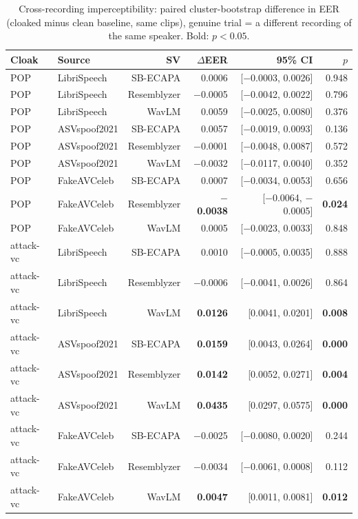 \documentclass[11pt]{article}
\begin{document}
\begin{table}[H]
\centering
\small
\caption{Cross-recording imperceptibility: paired cluster-bootstrap
difference in EER (cloaked minus clean baseline, same clips), genuine
trial = a different recording of the same speaker. Bold: $p<0.05$.}
\label{tab:crossrecording}
\begin{tabular}{llrrrr}
\toprule
Cloak & Source & SV & $\Delta$EER & 95\% CI & $p$ \\
\midrule
POP & LibriSpeech & SB-ECAPA & 0.0006 & [$-$0.0003, 0.0026] & 0.948 \\
POP & LibriSpeech & Resemblyzer & $-$0.0005 & [$-$0.0042, 0.0022] & 0.796 \\
POP & LibriSpeech & WavLM & 0.0059 & [$-$0.0025, 0.0080] & 0.376 \\
POP & ASVspoof2021 & SB-ECAPA & 0.0057 & [$-$0.0019, 0.0093] & 0.136 \\
POP & ASVspoof2021 & Resemblyzer & $-$0.0001 & [$-$0.0048, 0.0087] & 0.572 \\
POP & ASVspoof2021 & WavLM & $-$0.0032 & [$-$0.0117, 0.0040] & 0.352 \\
POP & FakeAVCeleb & SB-ECAPA & 0.0007 & [$-$0.0034, 0.0053] & 0.656 \\
POP & FakeAVCeleb & Resemblyzer & \textbf{$-$0.0038} & [$-$0.0064, $-$0.0005] & \textbf{0.024} \\
POP & FakeAVCeleb & WavLM & 0.0005 & [$-$0.0023, 0.0033] & 0.848 \\
\addlinespace
attack-vc & LibriSpeech & SB-ECAPA & 0.0010 & [$-$0.0005, 0.0035] & 0.888 \\
attack-vc & LibriSpeech & Resemblyzer & $-$0.0006 & [$-$0.0041, 0.0026] & 0.864 \\
attack-vc & LibriSpeech & WavLM & \textbf{0.0126} & [0.0041, 0.0201] & \textbf{0.008} \\
attack-vc & ASVspoof2021 & SB-ECAPA & \textbf{0.0159} & [0.0043, 0.0264] & \textbf{0.000} \\
attack-vc & ASVspoof2021 & Resemblyzer & \textbf{0.0142} & [0.0052, 0.0271] & \textbf{0.004} \\
attack-vc & ASVspoof2021 & WavLM & \textbf{0.0435} & [0.0297, 0.0575] & \textbf{0.000} \\
attack-vc & FakeAVCeleb & SB-ECAPA & $-$0.0025 & [$-$0.0080, 0.0020] & 0.244 \\
attack-vc & FakeAVCeleb & Resemblyzer & $-$0.0034 & [$-$0.0061, 0.0008] & 0.112 \\
attack-vc & FakeAVCeleb & WavLM & \textbf{0.0047} & [0.0011, 0.0081] & \textbf{0.012} \\

\end{tabular}
\end{table}
\end{document}

